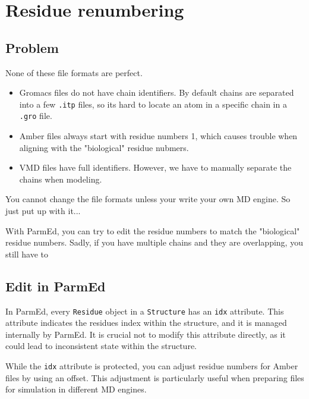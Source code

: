 \documentclass[
]{article}
\begin{document}
\hypertarget{residue-renumbering}{%
\section{Residue renumbering}\label{residue-renumbering}}

\hypertarget{problem}{%
\subsection{Problem}\label{problem}}

None of these file formats are perfect.

\begin{itemize}
\item
  Gromacs files do not have chain identifiers. By default chains are
  separated into a few \texttt{.itp} files, so it\textquotesingle s hard
  to locate an atom in a specific chain in a \texttt{.gro} file.
\item
  Amber files always start with residue numbers 1, which causes trouble
  when aligning with the "biological" residue nubmers.
\item
  VMD files have full identifiers. However, we have to manually separate
  the chains when modeling.
\end{itemize}

You cannot change the file formats unless your write your own MD engine.
So just put up with it...

With ParmEd, you can try to edit the residue numbers to match the
"biological" residue numbers. Sadly, if you have multiple chains and
they are overlapping, you still have to

\hypertarget{edit-in-parmed}{%
\subsection{Edit in ParmEd}\label{edit-in-parmed}}

In ParmEd, every \texttt{Residue} object in a \texttt{Structure} has an
\texttt{idx} attribute. This attribute indicates the
residue\textquotesingle s index within the structure, and it is managed
internally by ParmEd. It is crucial not to modify this attribute
directly, as it could lead to inconsistent state within the structure.

While the \texttt{idx} attribute is protected, you can adjust residue
numbers for Amber files by using an offset. This adjustment is
particularly useful when preparing files for simulation in different MD
engines.
\end{document}
